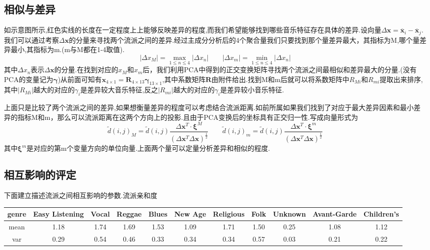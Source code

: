 \documentclass[a4paper,12pt]{article}
\begin{document}
\begin{spacing}{1.2}
\subsection{相似与差异}
如示意图所示,红色实线的长度在一定程度上上能够反映差异的程度,而我们希望能够找到哪些音乐特征存在具体的差异.设向量$\Delta\bm{x}=\overline{\bm{x}}_{i}-\overline{\bm{x}}_{j}$.我们可以通过考察$\Delta\bm{x}$的分量来寻找两个流派之间的差异.经过主成分分析后的4个聚合量我们只要找到那个量差异最大，其指标为M,哪个量差异最小,其指标为m.(m与M都在1-4取值).
$$
|\Delta x_{M}|=\max\limits_{1\leqslant n\leqslant4}|\Delta x_{n}|\qquad |\Delta x_{m}|=\min\limits_{1\leqslant n\leqslant4}|\Delta x_{n}|
$$
其中$\Delta x_{n}$表示$\Delta\bm{x}$的分量.在找到对应的$x_{M}$和$x_{m}$后，我们利用PCA中得到的正交变换矩阵寻找两个流派之间最相似和差异最大的分量.(没有PCA的变量记为$\bm{\gamma}$)从前面可知有$\bm{x}_{4 \times 1}=\bm{R}_{4\times 13}\bm{\gamma}_{13\times 1}$,其中系数矩阵$\bm{R}$由附件给出.找到M和m后就可以将系数矩阵中$R_{Mi}$和$R_{mi}$提取出来排序,其中$|R_{Mi}|$越大的对应的$\gamma_{i}$是差异较大音乐特征,反之$|R_{mi}|$越大的对应的$\gamma_{i}$是差异较小音乐特征.
\par
上面只是比较了两个流派之间的差异,如果想衡量差异的程度可以考虑结合流派距离.如前所属如果我们找到了对应于最大差异因素和最小差异的指标M和m，那么可以流派距离在这两个方向上的投影.且由于PCA变换后的坐标具有正交归一性.写成向量形式为
$$
\widetilde{d}(i,j)_{M}=\widetilde{d}(i,j)\frac{\Delta\bm{x}^{T}\cdot\bm{\xi}^{M}}{(\Delta\bm{x}^{T}\Delta\bm{x})^{\frac{1}{2}}}\qquad
\widetilde{d}(i,j)_{m}=\widetilde{d}(i,j)\frac{\Delta\bm{x}^{T}\cdot\bm{\xi}^{m}}{(\Delta\bm{x}^{T}\Delta\bm{x})^{\frac{1}{2}}}
$$
其中$\bm{\xi}^{m}$是对应的第m个变量方向的单位向量.上面两个量可以定量分析差异和相似的程度.
\subsection{相互影响的评定}
下面建立描述流派之间相互影响的参数.流派亲和度
\vspace{15cm}
 \begin{table}[H]
 	\centering
  \begin{tabular}{ccccccccccc}
 	\toprule[1.5pt]
 	genre&Easy Listening&Vocal&Reggae&Blues&New Age&Religious&Folk&Unknown&Avant-Garde&Children's\\
 	\hline
 	mean&1.18&1.74&1.69&1.53&1.09&1.71&1.50&0.25&1.08&1.12\\
    var&0.29&0.54&0.46&0.33&0.34&0.34&0.57&0.03&0.21&0.22\\
 	\bottomrule[1.5pt]
\end{tabular}
 \end{table}	
\end{spacing}
\end{document}
